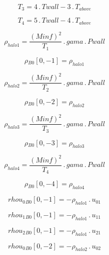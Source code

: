 \documentclass{article}
\begin{document}
\begin{dmath}T_{3} = 4 \,.\, Twall - 3 \,.\, T_{above}\end{dmath}

\begin{dmath}T_{4} = 5 \,.\, Twall - 4 \,.\, T_{above}\end{dmath}

\begin{dmath}\rho_{halo 1} = \frac{\left(Minf \right)^{2}}{T_{1}} \,.\, gama \,.\, Pwall\end{dmath}

\begin{dmath}{\rho{_{B0}}}[{0,-1}] = \rho_{halo 1}\end{dmath}

\begin{dmath}\rho_{halo 2} = \frac{\left(Minf \right)^{2}}{T_{2}} \,.\, gama \,.\, Pwall\end{dmath}

\begin{dmath}{\rho{_{B0}}}[{0,-2}] = \rho_{halo 2}\end{dmath}

\begin{dmath}\rho_{halo 3} = \frac{\left(Minf \right)^{2}}{T_{3}} \,.\, gama \,.\, Pwall\end{dmath}

\begin{dmath}{\rho{_{B0}}}[{0,-3}] = \rho_{halo 3}\end{dmath}

\begin{dmath}\rho_{halo 4} = \frac{\left(Minf \right)^{2}}{T_{4}} \,.\, gama \,.\, Pwall\end{dmath}

\begin{dmath}{\rho{_{B0}}}[{0,-4}] = \rho_{halo 4}\end{dmath}

\begin{dmath}{rhou_{0}{_{B0}}}[{0,-1}] = - \rho_{halo 1} \,.\, u_{01}\end{dmath}

\begin{dmath}{rhou_{1}{_{B0}}}[{0,-1}] = - \rho_{halo 1} \,.\, u_{11}\end{dmath}

\begin{dmath}{rhou_{2}{_{B0}}}[{0,-1}] = - \rho_{halo 1} \,.\, u_{21}\end{dmath}

\begin{dmath}{rhou_{0}{_{B0}}}[{0,-2}] = - \rho_{halo 2} \,.\, u_{02}\end{dmath}
\end{document}
